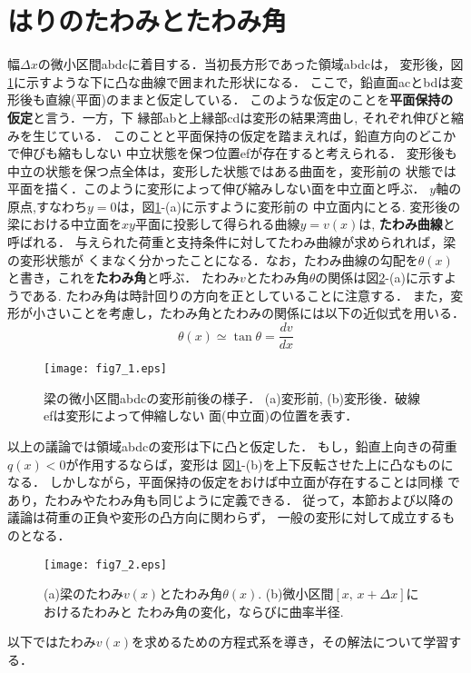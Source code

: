 \documentclass[10pt,a4j]{jbook}
\begin{document}
\section{はりのたわみとたわみ角}
幅$\Delta x$の微小区間abdcに着目する．当初長方形であった領域abdcは，
変形後，図\ref{fig:fig7_1}に示すような下に凸な曲線で囲まれた形状になる．
ここで，鉛直面acとbdは変形後も直線(平面)のままと仮定している．
このような仮定のことを{\bf 平面保持の仮定}と言う．一方，下
縁部abと上縁部cdは変形の結果湾曲し, それぞれ伸びと縮みを生じている．
このことと平面保持の仮定を踏まえれば，鉛直方向のどこかで伸びも縮もしない
中立状態を保つ位置efが存在すると考えられる．
変形後も中立の状態を保つ点全体は，変形した状態ではある曲面を，変形前の
状態では平面を描く．このように変形によって伸び縮みしない面を中立面と呼ぶ．
$y$軸の原点,すなわち$y=0$は，図\ref{fig:fig7_1}-(a)に示すように変形前の
中立面内にとる. 変形後の梁における中立面を$xy$平面に投影して得られる曲線$y=v(x)$は,
{\bf たわみ曲線}と呼ばれる．
与えられた荷重と支持条件に対してたわみ曲線が求められれば，梁の変形状態が
くまなく分かったことになる．なお，たわみ曲線の勾配を$\theta(x)$と書き，これを{\bf たわみ角}と呼ぶ．
たわみ$v$とたわみ角$\theta$の関係は図\ref{fig:fig7_2}-(a)に示すようである.
たわみ角は時計回りの方向を正としていることに注意する．
また，変形が小さいことを考慮し，たわみ角とたわみの関係には以下の近似式を用いる．
\begin{equation}
	\theta(x) \simeq \tan \theta =\frac{dv}{dx}
	\label{eqn:th_apprx}
\end{equation}
\begin{figure}
	\begin{center}
	\texttt{[image: fig7\_1.eps]} 
	\end{center}
	\caption{
		梁の微小区間abdcの変形前後の様子．
		(a)変形前, (b)変形後．破線efは変形によって伸縮しない
		面(中立面)の位置を表す．
	} 
	\label{fig:fig7_1}
\end{figure}
以上の議論では領域abdcの変形は下に凸と仮定した．
もし，鉛直上向きの荷重$q(x)<0$が作用するならば，変形は
図\ref{fig:fig7_1}-(b)を上下反転させた上に凸なものになる．
しかしながら，平面保持の仮定をおけば中立面が存在することは同様
であり，たわみやたわみ角も同じように定義できる．
従って，本節および以降の議論は荷重の正負や変形の凸方向に関わらず，
一般の変形に対して成立するものとなる．
\begin{figure}
	\begin{center}
	\texttt{[image: fig7\_2.eps]} 
	\end{center}
	\caption{
	(a)梁のたわみ$v(x)$とたわみ角$\theta(x)$. 
	(b)微小区間$\left[x, \, x+\Delta x \right]$におけるたわみと
	たわみ角の変化，ならびに曲率半径.
	 } 
	\label{fig:fig7_2}
\end{figure}
以下ではたわみ$v(x)$を求めるための方程式系を導き，その解法について学習する．
\end{document}
